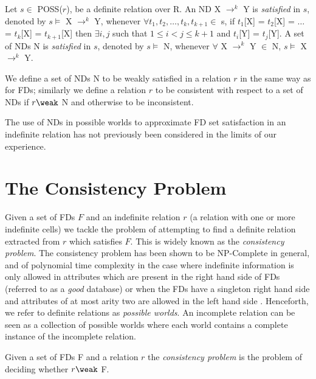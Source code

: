 \begin{definition}\label{def:sat-nd-indef}
\begin{rm}
Let $s \in$ POSS($r$), be a definite relation over R.
An ND X $\to^k$ Y is {\em satisfied} in $s$,
denoted by $s \models$ X $\to^k$ Y, whenever
$\forall t_1, t_2, \ldots, t_k, t_{k+1} \in$ s, if 
$t_1$[X] = $t_2$[X] = $\ldots$ = $t_k$[X] = $t_{k+1}$[X] then 
$\exists i,j$ such that $1 \le i < j \le k+1$
and $t_i$[Y] = $t_j$[Y].
A set of NDs N is {\em satisfied} in $s$,
denoted by $s \models$ N, whenever
$\forall$ X $\to^k$ Y $\in$ N, $s \models$ X $\to^k$ Y.

We define a set of NDs N to be weakly satisfied in a relation $r$
in the same way as for FDs; similarly we define 
a relation $r$ to be consistent with respect to a set of NDs if
$r \weak$ N and otherwise to be inconsistent.
\end{rm}
\end{definition}

\smallskip

The use of NDs in possible worlds to approximate FD set satisfaction
in an indefinite relation has not previously been considered in the
limits of our experience.

\section{The Consistency Problem}\label{sec:conprob}


Given a set of FDs $F$ and an indefinite relation $r$ (a relation with one or
more indefinite cells) we tackle the problem of attempting
to find a definite relation extracted from $r$ which satisfies $F$.
This is widely known as the {\em consistency problem}.  
The consistency
problem has been shown to be NP-Complete in general, and of 
polynomial time complexity in the case where indefinite information is
only allowed in attributes which are present in the right hand side of
FDs (referred to as a {\em good} database) or when the FDs have a singleton right hand side and attributes of
at most arity two are allowed in the left hand side \cite{vn95}. 
 Henceforth, we refer to definite relations as {\em possible worlds}.
An incomplete relation can be seen as a collection of possible worlds
where each world contains a complete instance of the incomplete
relation. 

\begin{definition}\label{def:cons}
\begin{rm}
Given a set of FDs F and a relation $r$ the {\em consistency problem}
is the problem of deciding whether $r \weak$ F. 
\end{rm}
\end{definition}


